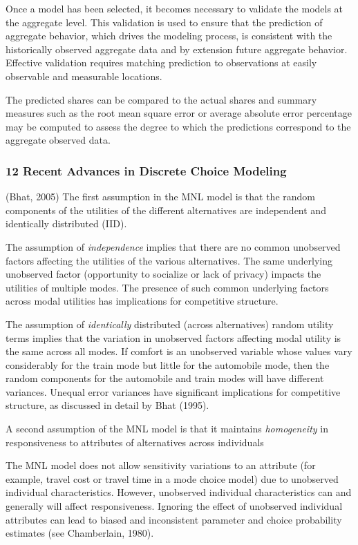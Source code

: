 \documentclass[
]{article}
\begin{document}
Once a model has been selected, it becomes necessary to validate the
models at the aggregate level. This validation is used to ensure that
the prediction of aggregate behavior, which drives the modeling process,
is consistent with the historically observed aggregate data and by
extension future aggregate behavior. Effective validation requires
matching prediction to observations at easily observable and measurable
locations.

The predicted shares can be compared to the actual shares and summary
measures such as the root mean square error or average absolute error
percentage may be computed to assess the degree to which the predictions
correspond to the aggregate observed data.

\hypertarget{recent-advances-in-discrete-choice-modeling}{%
\subsubsection{12 Recent Advances in Discrete Choice
Modeling}\label{recent-advances-in-discrete-choice-modeling}}

(Bhat, 2005) The first assumption in the MNL model is that the random
components of the utilities of the different alternatives are
independent and identically distributed (IID).

The assumption of \emph{independence} implies that there are no common
unobserved factors affecting the utilities of the various alternatives.
The same underlying unobserved factor (opportunity to socialize or lack
of privacy) impacts the utilities of multiple modes. The presence of
such common underlying factors across modal utilities has implications
for competitive structure.

The assumption of \emph{identically} distributed (across alternatives)
random utility terms implies that the variation in unobserved factors
affecting modal utility is the same across all modes. If comfort is an
unobserved variable whose values vary considerably for the train mode
but little for the automobile mode, then the random components for the
automobile and train modes will have different variances. Unequal error
variances have significant implications for competitive structure, as
discussed in detail by Bhat (1995).

A second assumption of the MNL model is that it maintains
\emph{homogeneity} in responsiveness to attributes of alternatives
across individuals

The MNL model does not allow sensitivity variations to an attribute (for
example, travel cost or travel time in a mode choice model) due to
unobserved individual characteristics. However, unobserved individual
characteristics can and generally will affect responsiveness. Ignoring
the effect of unobserved individual attributes can lead to biased and
inconsistent parameter and choice probability estimates (see
Chamberlain, 1980).
\end{document}
